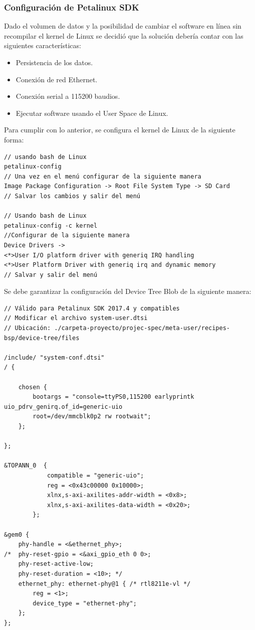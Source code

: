 \subsubsection{Configuración de Petalinux SDK}

Dado el volumen de datos y la posibilidad de cambiar el software en línea sin recompilar el kernel de Linux se decidió que la solución debería contar con las siguientes características:

\begin{itemize}
\item Persistencia de los datos.
\item Conexión de red Ethernet.
\item Conexión serial a 115200 baudios.
\item Ejecutar software usando el User Space de Linux.
\end{itemize}

Para cumplir con lo anterior, se configura el kernel de Linux de la siguiente forma:

\begin{verbatim}
// usando bash de Linux
petalinux-config
// Una vez en el menú configurar de la siguiente manera
Image Package Configuration -> Root File System Type -> SD Card
// Salvar los cambios y salir del menú

// Usando bash de Linux
petalinux-config -c kernel
//Configurar de la siguiente manera
Device Drivers -> 
<*>User I/O platform driver with generiq IRQ handling
<*>User Platform Driver with generiq irq and dynamic memory
// Salvar y salir del menú
\end{verbatim}

Se debe garantizar la configuración del Device Tree Blob de la siguiente manera:

\begin{verbatim}
// Válido para Petalinux SDK 2017.4 y compatibles
// Modificar el archivo system-user.dtsi
// Ubicación: ./carpeta-proyecto/projec-spec/meta-user/recipes-bsp/device-tree/files

/include/ "system-conf.dtsi"
/ {

	chosen {
		bootargs = "console=ttyPS0,115200 earlyprintk uio_pdrv_genirq.of_id=generic-uio
        root=/dev/mmcblk0p2 rw rootwait";
	};

};

&TOPANN_0  {
			compatible = "generic-uio";
			reg = <0x43c00000 0x10000>;
			xlnx,s-axi-axilites-addr-width = <0x8>;
			xlnx,s-axi-axilites-data-width = <0x20>;
		};

&gem0 {
	phy-handle = <&ethernet_phy>;
/*	phy-reset-gpio = <&axi_gpio_eth 0 0>;
	phy-reset-active-low;	
	phy-reset-duration = <10>; */
	ethernet_phy: ethernet-phy@1 { /* rtl8211e-vl */
		reg = <1>;
		device_type = "ethernet-phy";
	};
};
\end{verbatim}

